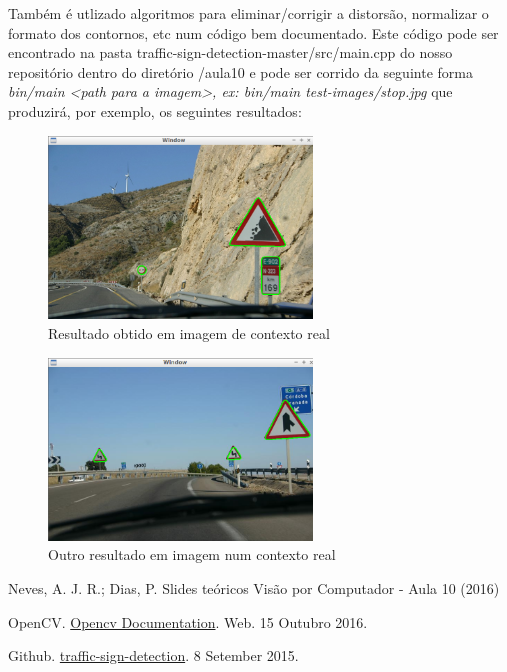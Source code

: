 \documentclass[portuguese, times, mirror]{revdetua}
\begin{document}
Também é utlizado algoritmos para eliminar/corrigir a distorsão, normalizar o formato dos contornos, etc num código bem documentado. Este código pode ser encontrado na pasta traffic-sign-detection-master/src/main.cpp do nosso repositório dentro do diretório /aula10 e pode ser corrido da seguinte forma \textit{bin/main <path para a imagem>, ex: bin/main test-images/stop.jpg} que produzirá, por exemplo, os seguintes resultados:

\newpage

\begin{figure}[ht!]
\centering
\includegraphics[width=70mm]{img/ex_adicional2.png}
\caption{Resultado obtido em imagem de contexto real}
\end{figure}

\begin{figure}[ht!]
\centering
\includegraphics[width=70mm]{img/ex_adicional3.png}
\caption{Outro resultado em imagem num contexto real}
\end{figure}




\begin{thebibliography}{1} %

Neves, A. J. R.; Dias, P. Slides teóricos Visão por Computador - Aula 10 (2016)

OpenCV. \href{hhttp://docs.opencv.org/}{Opencv Documentation}. Web. 15 Outubro 2016. 

Github. \href{https://github.com/glemaitre/traffic-sign-detection
}{traffic-sign-detection}. 8 Setember 2015.




\end{thebibliography}
\end{document}
